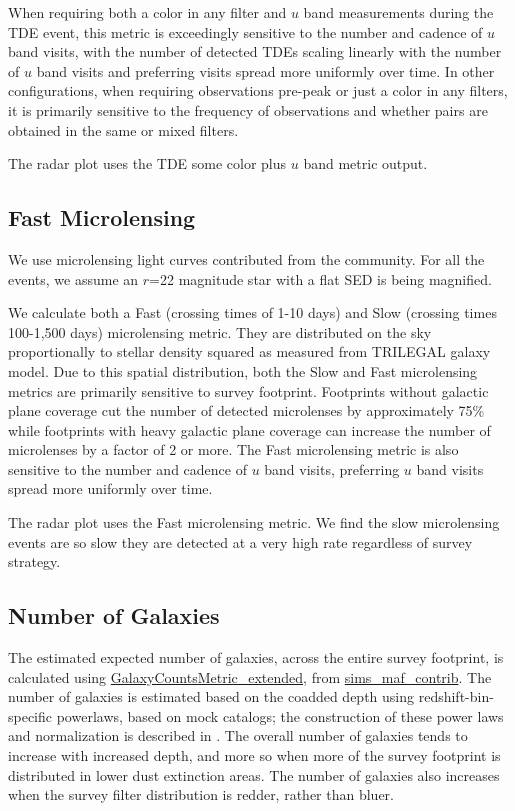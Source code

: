 When requiring both a color in any filter and $u$ band measurements during the TDE event, this metric is exceedingly sensitive to the number and cadence of $u$ band visits, with the number of detected TDEs scaling linearly with the number of $u$ band visits and preferring visits spread more uniformly over time. In other configurations, when requiring observations pre-peak or just a color in any filters, it is primarily sensitive to the frequency of observations and whether pairs are obtained in the same or mixed filters.

The radar plot uses the TDE some color plus $u$ band metric output.

\subsection{Fast Microlensing}

We use microlensing light curves contributed from the community. For all the events, we assume an $r$=22 magnitude star with a flat SED is being magnified. 

We calculate both a Fast (crossing times of 1-10 days) and Slow (crossing times 100-1,500 days) microlensing metric. They are distributed on the sky proportionally to stellar density squared as measured from TRILEGAL galaxy model.  Due to this spatial distribution, both the Slow and Fast microlensing metrics are primarily sensitive to survey footprint. Footprints without galactic plane coverage cut the number of detected microlenses by approximately 75\% while footprints with heavy galactic plane coverage can increase the number of microlenses by a factor of 2 or more. The Fast microlensing metric is also sensitive to the number and cadence of $u$ band visits, preferring $u$ band visits spread more uniformly over time. 

The radar plot uses the Fast microlensing metric. We find the slow microlensing events are so slow they are detected at a very high rate regardless of survey strategy. 

\subsection{Number of Galaxies}

The estimated expected number of galaxies, across the entire survey footprint, is calculated using \href{https://github.com/LSST-nonproject/sims_maf_contrib/blob/master/mafContrib/LSSObsStrategy/galaxyCountsMetric_extended.py#L26}{GalaxyCountsMetric\_extended}, from \href{https://github.com/LSST-nonproject/sims_maf_contrib}{sims\_maf\_contrib}. The number of galaxies is estimated based on the coadded depth using redshift-bin-specific powerlaws, based on mock catalogs; the construction of these power laws and normalization is described in \citet{2016ApJ...829...50A}. The overall number of galaxies tends to increase with increased depth, and more so when more of the survey footprint is distributed in lower dust extinction areas. The number of galaxies also increases when the survey filter distribution is redder, rather than bluer.

